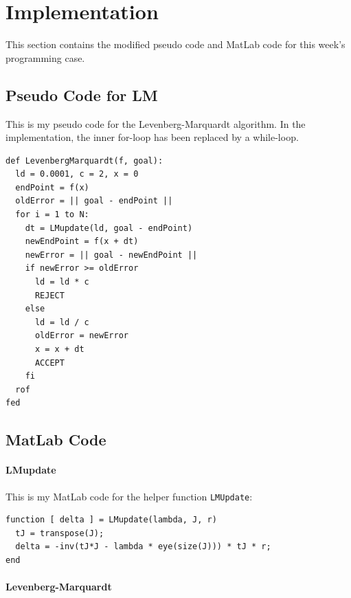 \documentclass[10pt,oneside,a4paper,final,english]{memoir}
\begin{document}
\section*{Implementation}
This section contains the modified pseudo code and MatLab code for
this week's programming case.
\subsection*{Pseudo Code for LM}

This is my pseudo code for the Levenberg-Marquardt algorithm. In the
implementation, the inner for-loop has been replaced by a while-loop.
\begin{verbatim}
def LevenbergMarquardt(f, goal):
  ld = 0.0001, c = 2, x = 0
  endPoint = f(x)
  oldError = || goal - endPoint ||
  for i = 1 to N:
    dt = LMupdate(ld, goal - endPoint)
    newEndPoint = f(x + dt)
    newError = || goal - newEndPoint ||
    if newError >= oldError
      ld = ld * c
      REJECT
    else
      ld = ld / c
      oldError = newError
      x = x + dt
      ACCEPT
    fi
  rof
fed
\end{verbatim}


\subsection{MatLab Code}
\paragraph{LMupdate}

This is my MatLab code for the helper function \texttt{LMUpdate}:
\begin{verbatim}
function [ delta ] = LMupdate(lambda, J, r)
  tJ = transpose(J);
  delta = -inv(tJ*J - lambda * eye(size(J))) * tJ * r;
end
\end{verbatim}


\paragraph{Levenberg-Marquardt}
\end{document}
